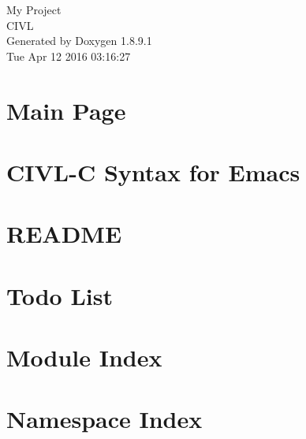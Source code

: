 \documentclass[twoside]{book}
\newcommand{\+}{\discretionary{\mbox{\scriptsize$\hookleftarrow$}}{}{}}
\newcommand{\clearemptydoublepage}{%
  \newpage{\pagestyle{empty}\cleardoublepage}%
}
\begin{document}
\hypersetup{pageanchor=false,
             bookmarks=true,
             bookmarksnumbered=true,
             pdfencoding=unicode
            }
\begin{titlepage}
\vspace*{7cm}
\begin{center}%
{\Large My Project \\[1ex]\large C\+I\+V\+L }\\
\vspace*{1cm}
{\large Generated by Doxygen 1.8.9.1}\\
\vspace*{0.5cm}
{\small Tue Apr 12 2016 03:16:27}\\
\end{center}
\end{titlepage}
\clearemptydoublepage
\tableofcontents
\clearemptydoublepage
{}
\hypersetup{pageanchor=true}

\chapter{Main Page}
\label{index}\hypertarget{index}{}
\chapter{C\+I\+V\+L-\/\+C Syntax for Emacs}
\label{md__home_arnabd_workspace_civl_trunk_emacs_README}
\hypertarget{md__home_arnabd_workspace_civl_trunk_emacs_README}{}

\chapter{R\+E\+A\+D\+M\+E}
\label{md__home_arnabd_workspace_civl_trunk_examples_omp_shtns_README}
\hypertarget{md__home_arnabd_workspace_civl_trunk_examples_omp_shtns_README}{}

\chapter{Todo List}
\label{todo}
\hypertarget{todo}{}

\chapter{Module Index}

\chapter{Namespace Index}

\end{document}
